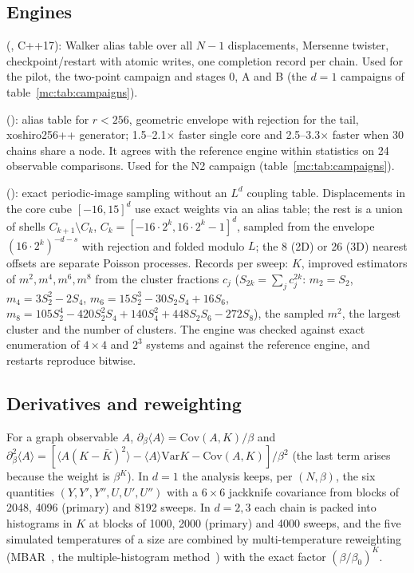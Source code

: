\subsection{Engines}
\begin{description}[leftmargin=1.2em]
\item[$d=1$, reference engine] (, C++17): Walker alias table over all $N-1$ displacements, Mersenne twister,
 checkpoint/restart with atomic writes, one completion record per chain. Used for the pilot, the two-point campaign and stages 0, A and B (the $d=1$ campaigns of table~\ref{mc:tab:campaigns}).
\item[$d=1$, specialized engine] (): alias table for $r<256$, geometric envelope with rejection for the tail,
 xoshiro256++ generator; 1.5--2.1$\times$ faster single core and 2.5--3.3$\times$ faster when 30 chains share a node. It agrees with the
 reference engine within statistics on 24 observable comparisons. Used for the N2 campaign (table~\ref{mc:tab:campaigns}).
\item[$d=2,3$] (): exact periodic-image sampling without an $L^d$ coupling table. Displacements in the core
 cube $[-16,15]^d$ use exact weights via an alias table; the rest is a union of shells $C_{k+1}\setminus C_k$, $C_k=[-16\cdot2^k,16\cdot2^k-1]^d$,
 sampled from the envelope $(16\cdot2^k)^{-d-s}$ with rejection and folded modulo $L$; the 8 (2D) or 26 (3D) nearest offsets are separate
 Poisson processes. Records per sweep: $K$, improved estimators of $m^2,m^4,m^6,m^8$ from the cluster fractions $c_j$
 ($S_{2k}=\sum_jc_j^{2k}$: $m_2=S_2$, $m_4=3S_2^2-2S_4$, $m_6=15S_2^3-30S_2S_4+16S_6$,
 $m_8=105S_2^4-420S_2^2S_4+140S_4^2+448S_2S_6-272S_8$), the sampled $m^2$, the largest cluster and the number of clusters. The engine was
 checked against exact enumeration of $4\times4$ and $2^3$ systems and against the reference engine, and restarts reproduce bitwise.
\end{description}

\subsection{Derivatives and reweighting}
For a graph observable $A$, $\partial_\beta\langle A\rangle=\mathrm{Cov}(A,K)/\beta$ and
$\partial_\beta^2\langle A\rangle=[\langle A(K-\bar K)^2\rangle-\langle A\rangle\mathrm{Var}K-\mathrm{Cov}(A,K)]/\beta^2$ (the last term arises
because the weight is $\beta^K$). In $d=1$ the analysis keeps, per $(N,\beta)$, the six quantities $(Y,Y',Y'',U,U',U'')$ with a $6\times6$
jackknife covariance from blocks of 2048, 4096 (primary) and 8192 sweeps. In $d=2,3$ each chain is packed into histograms in $K$ at blocks of
1000, 2000 (primary) and 4000 sweeps, and the five simulated temperatures of a size are combined by multi-temperature reweighting
(MBAR~\cite{mc:Shirts:2008xx}, the multiple-histogram method~\cite{mc:Ferrenberg:1989ui}) with the exact factor $(\beta/\beta_0)^K$.

